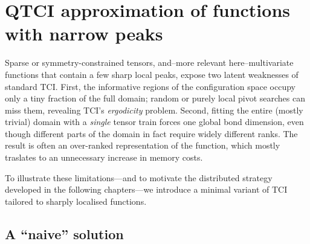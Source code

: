 \section{QTCI approximation of functions with narrow peaks}
\label{sec:TCIFallbacks}
Sparse or symmetry-constrained tensors, and--more relevant here--multivariate
functions that contain a few sharp local peaks, expose two latent weaknesses of standard TCI.
First, the informative regions of the configuration space occupy only a tiny fraction of the full domain; random or purely local pivot searches can miss them, revealing TCI's \emph{ergodicity} problem.
Second, fitting the entire (mostly trivial) domain with a \emph{single} tensor train forces one global bond dimension, even though different parts of the domain in fact require widely different ranks. The result is often an over-ranked representation of the function, which mostly traslates to an unnecessary increase in memory costs.

To illustrate these limitations—and to motivate the distributed strategy developed in the following chapters—we introduce a minimal variant of TCI tailored to sharply localised functions.


\subsection{A ``naive'' solution}

